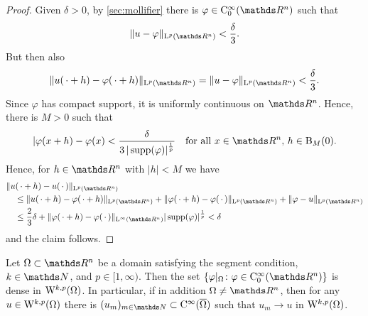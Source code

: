 \begin{proof}
  Given $\delta > 0$, by \ref{sec:mollifier} there is $\varphi \in \CC_0^\infty(\R^n)$ such that
  $$
  \|u - \varphi\|_{\Ell^p(\R^n)} < \frac{\delta}{3}.
  $$
  But then also
  $$
  \|u(\,\cdot + h) - \varphi(\,\cdot + h) \|_{\Ell^p(\R^n)} = \|u - \varphi\|_{\Ell^p(\R^n)} < \frac{\delta}{3}.
  $$
  Since $\varphi$ has compact support, it is uniformly continuous on $\R^n$.
  Hence, there is $M > 0$ such that
  $$
  |\varphi(x + h) - \varphi(x) < \frac{\delta}{3 \, |\supp(\varphi)|^{\frac{1}{p}}} \quad\text{for all } x \in \R^n\text{, } h \in \BB_M(0).
  $$
  Hence, for $h \in \R^n$ with $|h| < M$ we have
  \begin{align*}
    &\|u(\,\cdot + h) - u(\,\cdot\,)\|_{\Ell^p(\R^n)} \\
    &\quad \leq \|u(\,\cdot + h) - \varphi(\,\cdot + h) \|_{\Ell^p(\R^n)} + \|\varphi(\,\cdot + h) - \varphi(\,\cdot\,) \|_{\Ell^p(\R^n)} +  \|\varphi - u \|_{\Ell^p(\R^n)} \\
    &\quad\leq \frac{2}{3}\delta +  \|\varphi(\,\cdot + h) - \varphi(\,\cdot\,)\|_{\Ell^\infty(\R^n)} |\supp(\varphi)|^{\frac{1}{p}} 
    < \delta
  \end{align*}
  and the claim follows.
\end{proof}

\setcounter{equation}{3} %

\begin{thm}
  \label{thm:CinftyUpToBoundary}
  Let $\Omega \subset \R^n$ be a domain satisfying the segment condition, $k \in \N$, and $p \in [1,\infty)$.
    Then the set 
    $
    \{ \varphi|_\Omega \colon \varphi \in \CC_0^\infty(\R^n) \}
    $
    is dense in $\mathrm{W}^{k,p}(\Omega)$.
    In particular, if in addition $\Omega \neq \R^n$, then for any $u \in \mathrm{W}^{k,p}(\Omega)$ there is $(u_m)_{m \in \N} \subset \CC^\infty(\overline \Omega)$ such that $u_m \to u$ in $\mathrm{W}^{k,p}(\Omega)$.
\end{thm}

